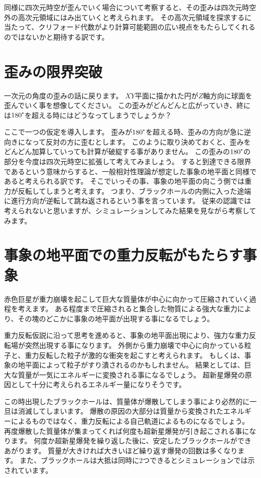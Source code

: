 \documentclass[a4paper,12pt,notitlepage]{jsreport}
\begin{document}
同様に四次元時空が歪んでいく場合について考察すると、その歪みは四次元時空外の高次元領域にはみ出ていくと考えられます。
その高次元領域を探求するに当たって、クリフォード代数がより計算可能範囲の広い視点をもたらしてくれるのではないかと期待する訳です。

\section{歪みの限界突破}

一次元の角度の歪みの話に戻ります。
$XY$平面に描かれた円が$Z$軸方向に球面を歪んでいく事を想像してください。
この歪みがどんどんと広がっていき、終には$180\tcdegree$を超える時にはどうなってしまうでしょうか？

ここで一つの仮定を導入します。
歪みが$180\tcdegree$を超える時、歪みの方向が急に逆向きになって反対の方に歪むとします。
このように取り決めておくと、歪みをどんどん加算していっても計算が破綻する事がありません。
この歪みの$180\tcdegree$の部分を今度は四次元時空に拡張して考えてみましょう。
すると到達できる限界であるという意味からすると、一般相対性理論が想定した事象の地平面と同様であると考えられる訳です。
そこでいっその事、事象の地平面の向こう側では重力が反転してしまうと考えます。
つまり、ブラックホールの内側に入った途端に進行方向が逆転して跳ね返されるという事を言っています。
従来の認識では考えられないと思いますが、シミュレーションしてみた結果を見ながら考察してみます。

\section{事象の地平面での重力反転がもたらす事象}

赤色巨星が重力崩壊を起こして巨大な質量体が中心に向かって圧縮されていく過程を考えます。
ある程度まで圧縮されると集合した物質による強大な重力により、その塊のどこかに事象の地平面が出現する事になるでしょう。

重力反転仮説に沿って思考を進めると、事象の地平面出現により、強力な重力反転場が突然出現する事になります。
外側から重力崩壊で中心に向かっている粒子と、重力反転した粒子が激的な衝突を起こすと考えられます。
もしくは、事象の地平面によって粒子がすり潰されるのかもしれません。
結果としては、巨大な質量が一気にエネルギーに変換される事になるでしょう。
超新星爆発の原因として十分に考えられるエネルギー量になりそうです。

この時出現したブラックホールは、質量体が爆散してしまう事により必然的に一旦は消滅してしまいます。
爆散の原因の大部分は質量から変換されたエネルギーによるものではなく、重力反転による自己軌道によるものになるでしょう。
再度爆散した質量体が集まってくれば何度も超新星爆発が引き起こされる事になります。
何度か超新星爆発を繰り返した後に、安定したブラックホールができあがります。
質量が大きければ大きいほど繰り返す爆発の回数は多くなります。
また、ブラックホールは大抵は同時に2つできるとシミュレーションでは示されています。
\end{document}
